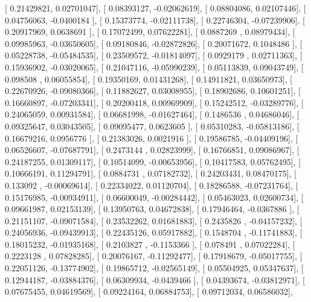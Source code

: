 \documentclass{article}
\begin{document}
       [ 0.21429821,  0.02701047],
       [ 0.08393127, -0.02062619],
       [ 0.08804086,  0.02107446],
       [ 0.04756063, -0.0400184 ],
       [ 0.15373774, -0.02111738],
       [ 0.22746304, -0.07239906],
       [ 0.20917969,  0.0638691 ],
       [ 0.17072499,  0.07622281],
       [ 0.0887269 ,  0.08979434],
       [ 0.09985963, -0.03650605],
       [ 0.09180846, -0.02872826],
       [ 0.20071672,  0.1048486 ],
       [ 0.05228738, -0.05484535],
       [ 0.23509572, -0.01814097],
       [ 0.0929179 ,  0.02711363],
       [ 0.15936902, -0.03020065],
       [ 0.21047116, -0.05990239],
       [ 0.05113839,  0.09043749],
       [ 0.098508  ,  0.06055854],
       [ 0.19350169,  0.01431268],
       [ 0.14911821,  0.03650973],
       [ 0.22670926, -0.09080366],
       [ 0.11882627,  0.03008955],
       [ 0.18902686,  0.10601251],
       [ 0.16660897, -0.07203341],
       [ 0.20200418,  0.00969909],
       [ 0.15242512, -0.03289776],
       [ 0.24065059,  0.00931584],
       [ 0.06681998, -0.01627464],
       [ 0.1486536 ,  0.04686046],
       [ 0.09325647,  0.03043505],
       [ 0.09095477,  0.0623605 ],
       [ 0.05310283, -0.05813186],
       [ 0.16679216,  0.0956776 ],
       [ 0.21383026,  0.0021916 ],
       [ 0.19586785, -0.04409196],
       [ 0.06526607, -0.07687791],
       [ 0.2473144 ,  0.02823999],
       [ 0.16766851,  0.09086967],
       [ 0.24187255,  0.01309117],
       [ 0.10514099, -0.00653956],
       [ 0.10417583,  0.05762495],
       [ 0.10666191,  0.11294791],
       [ 0.0884731 ,  0.07182732],
       [ 0.24203431,  0.08470175],
       [ 0.133092  , -0.00069614],
       [ 0.22334022,  0.01120704],
       [ 0.18286588, -0.07231764],
       [ 0.15176985, -0.00934911],
       [ 0.06600049, -0.00284442],
       [ 0.05463023,  0.02600734],
       [ 0.09661987,  0.02153139],
       [ 0.13950763,  0.04672838],
       [ 0.17946464, -0.0367886 ],
       [ 0.21151107, -0.09071584],
       [ 0.23532262,  0.01681883],
       [ 0.2435826 , -0.04157232],
       [ 0.24056936, -0.09439913],
       [ 0.22435126,  0.05917882],
       [ 0.1548704 , -0.11741883],
       [ 0.18015232, -0.01935168],
       [ 0.2103827 , -0.1153366 ],
       [ 0.078491  ,  0.07022284],
       [ 0.2223128 ,  0.07828285],
       [ 0.20076167, -0.11292477],
       [ 0.17918679, -0.05017755],
       [ 0.22051126, -0.13774902],
       [ 0.19865712, -0.02565149],
       [ 0.05504925,  0.05347637],
       [ 0.12944187, -0.03884376],
       [ 0.06309934, -0.0439466 ],
       [ 0.04393674, -0.03812971],
       [ 0.07675455,  0.04619569],
       [ 0.09224164,  0.06884753],
       [ 0.09712034,  0.06586032],
\end{document}
